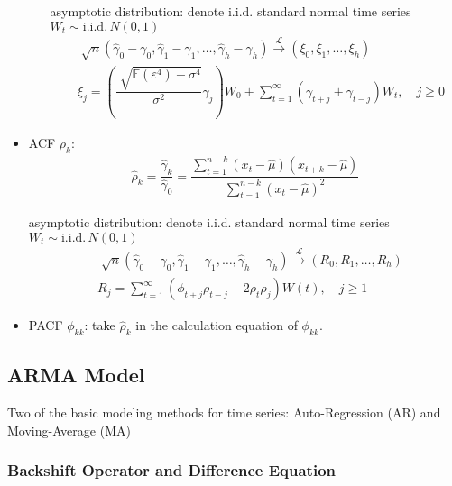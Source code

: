 \begin{itemize}[topsep=2pt,itemsep=0pt]
\begin{itemize}[topsep=2pt,itemsep=0pt]
            asymptotic distribution: denote i.i.d. standard normal time series $ W_t\sim \mathrm{i.i.d.} \,N(0,1)  $
            \begin{align}
                &\sqrt[]{n}(\hat{\gamma }_0-\gamma _0,\hat{\gamma }_1-\gamma _1,\ldots,\hat{\gamma }_h-\gamma _h)\xrightarrow[]{\mathscr{L}} (\xi _0,\xi _1,\ldots,\xi _h)\\
                &\xi _j=(\dfrac{\sqrt[]{\mathbb{E}\left( \varepsilon ^4 \right) -\sigma ^4}}{\sigma ^2}\gamma _j)W_0+\sum_{t=1}^\infty (\gamma _{t+j}+\gamma _{t-j})W_t,\quad j\geq 0
            \end{align}
                
        \end{itemize}
        
            
        \item ACF $ \rho _k $:
        \begin{align*}
            \hat{\rho }_k=\dfrac{\hat{\gamma }_k}{\hat{\gamma }_0}=\dfrac{\sum_{t=1}^{n-k}(x_t-\hat{\mu })(x_{t+k}-\hat{\mu })}{\sum_{t=1}^{n-k}(x_t-\hat{\mu })^2}
        \end{align*}

        asymptotic distribution: denote i.i.d. standard normal time series $ W_t\sim \mathrm{i.i.d.} \,N(0,1)  $
        \begin{align}\label{EqaEstimationDistributionOfACF}
            &\sqrt[]{n}(\hat{\gamma }_0-\gamma _0,\hat{\gamma }_1-\gamma _1,\ldots,\hat{\gamma }_h-\gamma _h)\xrightarrow[]{\mathscr{L}} (R _0,R _1,\ldots,R _h)\\
            &R _j=\sum_{t=1}^\infty(\phi _{t+j}\rho _{t-j}-2\rho _t\rho _j)W(t),\quad j\geq 1
        \end{align}
        \item PACF $ \phi _{kk} $: take $ \hat{\rho }_k $ in the calculation equation of $ \phi _{kk} $.
    \end{itemize}
    
        


\subsection{ARMA Model}
    Two of the basic modeling methods for time series: Auto-Regression (AR) and Moving-Average (MA)
    
\subsubsection{Backshift Operator and Difference Equation}

